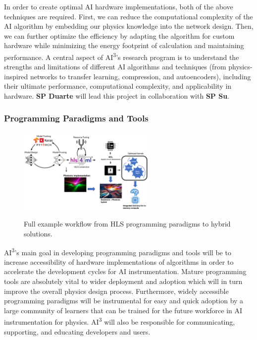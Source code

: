In order to create optimal AI hardware implementations, both of the above techniques are required.  First, we can reduce the computational complexity of the AI algorithm by embedding our physics knowledge into the network design. Then, we can further optimize the efficiency by adapting the algorithm for custom hardware while minimizing the energy footprint of calculation and maintaining performance. A central aspect of AI\textsuperscript{3}'s research program is to understand the strengths and limitations of different AI algorithms and techniques (from physics-inspired networks to transfer learning, compression, and autoencoders), including their ultimate performance, computational complexity, and applicability in hardware. {\bf SP Duarte} will lead this project in collaboration with {\bf SP Su}.


\subsubsection{Programming Paradigms and Tools} \label{sec:Programming}


\begin{figure}
\centering
\vskip-15pt 
  {\includegraphics[keepaspectratio, width=0.6\textwidth]{proposal/img/ProgrammingFlow.png}}
  \caption{Full example workflow from HLS programming paradigms to hybrid solutions.}
  \label{fig:programming}
  \vskip-10pt 
\end{figure}
AI\textsuperscript{3}'s main goal in developing programming paradigms and tools will be to increase accessibility of hardware implementations of  algorithms in order to accelerate the development cycles for AI instrumentation. Mature programming tools are absolutely vital to wider deployment and adoption which will in turn improve the overall physics design process. Furthermore, widely accessible programming paradigms will be instrumental for easy and quick adoption by a large community of learners that can be trained for the future workforce in AI instrumentation for physics. %
AI\textsuperscript{3} will also be responsible for communicating, supporting, and educating developers and users. 


